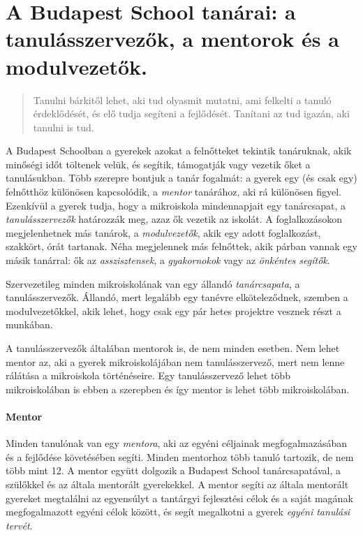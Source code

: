   \section{A Budapest School tanárai: a tanulásszervezők, a mentorok és a modulvezetők.}
  \label{sec:tanarok}
  \begin{quote}

    Tanulni bárkitől lehet, aki tud olyasmit mutatni, ami felkelti a tanuló
    érdeklődését, és elő tudja segíteni a fejlődését. Tanítani az tud igazán, aki tanulni is tud.
\end{quote}
A Budapest Schoolban a gyerekek azokat a felnőtteket tekintik tanáruknak, akik minőségi időt töltenek velük, és segítik, támogatják vagy vezetik őket a tanulásukban. Több szerepre bontjuk a tanár fogalmát: a gyerek egy (és csak egy) felnőtthöz különösen kapcsolódik, a \emph{mentor} tanárához, aki rá különösen figyel. Ezenkívül a gyerek tudja, hogy a mikroiskola mindennapjait egy tanárcsapat, a \emph{tanulásszervezők} határozzák meg, azaz ők vezetik az iskolát.  A foglalkozásokon megjelenhetnek más tanárok, a \emph{modulvezetők}, akik egy adott foglalkozást, szakkört, órát tartanak. Néha megjelennek más felnőttek, akik párban vannak egy másik tanárral: ők az \emph{asszisztensek}, a \emph{gyakornokok} vagy az \emph{önkéntes segítők}.

Szervezetileg minden mikroiskolának van egy állandó \emph{tanárcsapata}, a tanulásszervezők. Állandó, mert legalább egy tanévre elköteleződnek, szemben a modulvezetőkkel, akik lehet, hogy csak egy pár hetes projektre vesznek részt a munkában.

A tanulásszervezők általában mentorok is, de nem minden esetben. Nem lehet mentor az, aki a gyerek mikroiskolájában nem tanulásszervező, mert nem lenne rálátása a mikroiskola történéseire. Egy tanulásszervező lehet több mikroiskolában is ebben a szerepben és így mentor is lehet több mikroiskolában.

\paragraph{Mentor}
  Minden tanulónak van egy \emph{mentora}, aki az egyéni céljainak megfogalmazásában és
  a fejlődése követésében segíti. Minden mentorhoz több tanuló tartozik, de nem
  több mint 12. A mentor együtt dolgozik a Budapest School tanárcsapatával, a
  szülőkkel és az általa mentorált gyerekekkel. A mentor segíti az általa
  mentorált gyereket megtalálni az egyensúlyt a tantárgyi fejlesztési célok és a
  saját magának megfogalmazott egyéni célok között, és segít megalkotni a gyerek \emph{egyéni
  tanulási tervét}.

